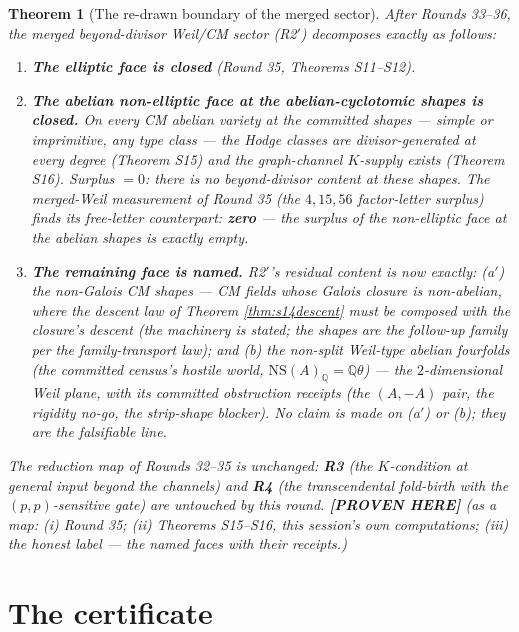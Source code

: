 \documentclass[11pt]{article}
\newtheorem{theorem}{Theorem}
\newcommand{\PROVEN}{\textbf{[PROVEN HERE]}}
\newcommand{\Q}{\mathbb{Q}}
\newcommand{\NS}{\mathrm{NS}}
\begin{document}
\begin{theorem}[The re-drawn boundary of the merged sector]\label{thm:s17}
After Rounds 33--36, the merged beyond-divisor Weil/CM sector (R2$'$) decomposes
exactly as follows:
\begin{enumerate}[label=(\roman*)]
\item \textbf{The elliptic face is closed} (Round 35, Theorems S11--S12).
\item \textbf{The abelian non-elliptic face at the abelian-cyclotomic shapes is
closed.} On every CM abelian variety at the committed shapes --- simple or
imprimitive, any type class --- the Hodge classes are divisor-generated at every
degree (Theorem S15) and the graph-channel $K$-supply exists (Theorem S16).
Surplus $=0$: there is \emph{no} beyond-divisor content at these shapes. The
merged-Weil measurement of Round 35 (the $4,15,56$ factor-letter surplus) finds
its free-letter counterpart: \textbf{zero} --- the surplus of the non-elliptic
face at the abelian shapes is exactly empty.
\item \textbf{The remaining face is named.} R2$'$'s residual content is now
exactly: (a$'$) the \emph{non-Galois} CM shapes --- CM fields whose Galois
closure is non-abelian, where the descent law of Theorem
\ref{thm:s14descent} must be composed with the closure's descent (the machinery
is stated; the shapes are the follow-up family per the family-transport law);
and (b) the \emph{non-split Weil-type} abelian fourfolds (the committed census's
hostile world, $\NS(A)_\Q=\Q\theta$) --- the $2$-dimensional Weil plane, with
its committed obstruction receipts (the $(A,-A)$ pair, the rigidity no-go, the
strip-shape blocker). No claim is made on (a$'$) or (b); they are the
falsifiable line.
\end{enumerate}
The reduction map of Rounds 32--35 is unchanged: \textbf{R3} (the
$K$-condition at general input beyond the channels) and \textbf{R4} (the
transcendental fold-birth with the $(p,p)$-sensitive gate) are untouched by this
round.
\PROVEN{} (as a map: (i) Round 35; (ii) Theorems S15--S16, this session's own
computations; (iii) the honest label --- the named faces with their receipts.)
\end{theorem}

\section{The certificate}
\end{document}

